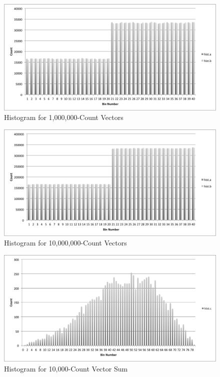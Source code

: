 \documentclass{acm_proc_article-sp}
\begin{document}
\begin{figure}[tbp]
  \centering
  \caption{Histogram for 1,000,000-Count Vectors}
	\label{hist1000000}
  \includegraphics[width=40pc]{Pics/1000000.png}
\end{figure}

\begin{figure}[tbp]
  \centering
  \caption{Histogram for 10,000,000-Count Vectors}
	\label{hist10000000}
  \includegraphics[width=40pc]{Pics/10000000.png}
\end{figure}


\begin{figure}[tbp]
  \centering
  \caption{Histogram for 10,000-Count Vector Sum}
	\label{hist10000c}
  \includegraphics[width=40pc]{Pics/10000c.png}
\end{figure}
\end{document}

